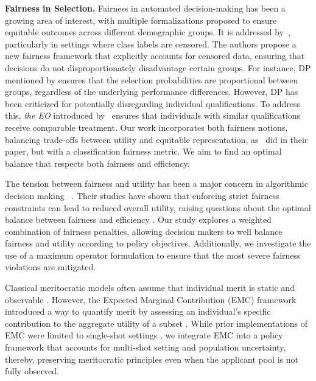 \documentclass[acmlarge]{acmart-ecaf}
\begin{document}
\textbf{Fairness in Selection.} Fairness in automated decision-making has been a growing area of interest, with multiple formalizations proposed to ensure equitable outcomes across different demographic groups. It is addressed by~\cite{zhang2021fair,zhang2015fairness}, particularly in settings where class labels are censored. The authors propose a new fairness framework that explicitly accounts for censored data, ensuring that decisions do not disproportionately disadvantage certain groups. For instance, DP mentioned by \cite{caton2024fairness,chouldechova2017fair,corbett2017algorithmic,dwork2012fairness,dwork2018group,dwork2018individual} ensures that the selection probabilities are proportional between groups, regardless of the underlying performance differences. However, DP has been criticized for potentially disregarding individual qualifications. To address this, \emph{the EO} introduced by~\cite{hardt2016equality} ensures that individuals with similar qualifications receive comparable treatment. Our work incorporates both fairness notions, balancing trade-offs between utility and equitable representation, as~\cite{bagriacik2024multiple} did in their paper, but with a classification fairness metric. We aim to find an optimal balance that respects both fairness and efficiency.

The tension between fairness and utility has been a major concern in algorithmic decision making ~\cite{corbett2017algorithmic}. Their studies have shown that enforcing strict fairness constraints can lead to reduced overall utility, raising questions about the optimal balance between fairness and efficiency \cite{berk2021fairness}. Our study explores a weighted combination of fairness penalties, allowing decision makers to well balance fairness and utility according to policy objectives. Additionally, we investigate the use of a maximum operator formulation to ensure that the most severe fairness violations are mitigated.


Classical meritocratic models often assume that individual merit is static and observable \cite{mas1995chapter,rawls1971theory}. However, the Expected Marginal Contribution (EMC) framework  introduced a way to quantify merit by assessing an individual's specific contribution to the aggregate utility of a subset \cite{kleine2022meritocracy}. While prior implementations of EMC were limited to single-shot settings , we integrate EMC into a policy framework that accounts for multi-shot setting and population uncertainty, thereby, preserving meritocratic principles even when the applicant pool is not fully observed.
\end{document}
